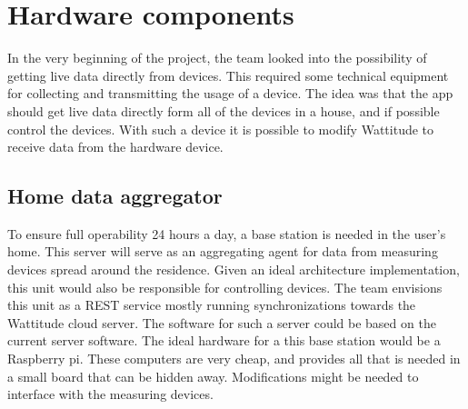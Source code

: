 \section{Hardware components}
In the very beginning of the project, the team looked into the possibility of getting live data directly from devices. This required some technical equipment for collecting and transmitting the usage of a device. The idea was that the app should get live data directly form all of the devices in a house, and if possible control the devices. With such a device it is possible to modify Wattitude to receive data from the hardware device.


\subsection{Home data aggregator}
To ensure full operability 24 hours a day, a base station is needed in the user's home. This server will serve as an aggregating agent for data from measuring devices spread around the residence. Given an ideal architecture implementation, this unit would also be responsible for controlling devices. The team envisions this unit as a REST service mostly running synchronizations towards the Wattitude cloud server. The software for such a server could be based on the current server software. The ideal hardware for a this base station would be a Raspberry pi. These computers are very cheap, and provides all that is needed in a small board that can be hidden away. Modifications might be needed to interface with the measuring devices. 

